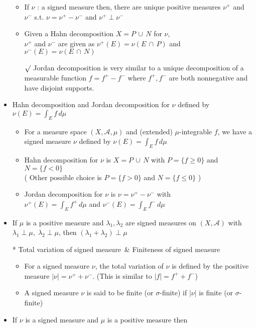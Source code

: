 \documentclass[12pt]{article}
\newcommand{\rmk}{$\surd$}
\newcommand{\A}{\mathcal{A}}
\newcommand{\union}{\,\cup\,}
\newcommand{\intersect}{\,\cap\,}
\begin{document}
\begin{itemize}
\begin{itemize}
        \item If $\nu$ : a signed measure then, there are unique positive measures $\nu^+$ and $\nu^-$ s.t. $\nu=\nu^+-\nu^-$ and $\nu^+ \perp \nu^-$
        \item Given a Hahn decomposition $X=P\union N$ for $\nu$, \\$\nu^+$ and $\nu^-$ are given as $\nu^+(E)=\nu(E\intersect P)$ and $\nu^-(E)=\nu(E\intersect N)$
        \item[\rmk] Jordan decomposition is very similar to a unique decomposition of a measurable function $f=f^+-f^-$ where $f^+, f^-$ are both nonnegative and have disjoint supports.
    \end{itemize}
    \item Hahn decomposition and Jordan decomposition for  $\nu$ defined by $\nu(E)=\int_E f\, d\mu$
    \begin{itemize}
        \item For a measure space $(X, \A, \mu)$ and  (extended) $\mu$-integrable $f$, we have a signed measure $\nu$ defined by $\nu(E)=\int_E f\,d\mu$
        \item Hahn decomposition for $\nu$ is $X=P\union N$ with $P=\{f\geq0\}$ and $N=\{f<0\}$ \\( Other possible choice is $P=\{f>0\}$ and $N=\{f\leq 0\}$ )
        \item Jordan decomposition for $\nu$ is $\nu=\nu^+-\nu^-$ with \\$\nu^+(E)=\int_E f^+\, d\mu$ and $\nu^-(E)=\int_E f^-\,d\mu$
    \end{itemize}
    \item If $\mu$ is a positive measure and $\lambda_1, \lambda_2$ are signed measures on $(X, \A)$ with $\lambda_1 \perp \mu, \; \lambda_2\perp \mu$, then $(\lambda_1+\lambda_2)\perp \mu$
    \item[*] Total variation of signed measure \,\&  Finiteness of signed measure 
    \begin{itemize}
        \item For a signed measure $\nu$, the total variation of $\nu$ is defined by the positive measure $|\nu|=\nu^+ + \nu^-$. (This is similar to $|f|=f^+ + f^-$)
        \item A signed measure $\nu$ is said to be finite (or $\sigma$-finite) if $|\nu|$ is finite (or $\sigma$-finite)
    \end{itemize}
    \item If $\nu$ is a signed measure and $\mu$ is a positive measure then \begin{enumerate}

\end{enumerate}
\end{itemize}
\end{document}
